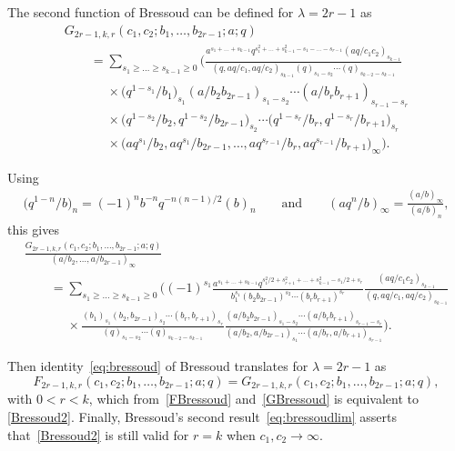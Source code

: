 \documentclass[pdftex]{sigma}
\numberwithin{equation}{section}
\begin{document}
The second function of Bressoud can be defined for $\lambda=2r-1$ as
\begin{gather*}
G_{2r-1,k,r}(c_1,c_2;b_1,\dots,b_{2r-1};a;q)\\
\qquad=\sum_{s_1\geq\dots\geq s_{k-1}\geq0}\bigg(\frac{a^{s_1+\dots+s_{k-1}}q^{s_1^2+\dots+s_{k-1}^2-s_{1}-\dots-s_{r-1}}(aq/c_1c_2)_{s_{k-1}}}{(q,aq/c_1,aq/c_2)_{s_{k-1}}(q)_{s_1-s_2} \cdots(q)_{s_{k-2}-s_{k-1}}}\\
\phantom{\qquad=}{}\times\bigl(q^{1-s_1}/b_1\bigr)_{s_1}(a/b_2b_{2r-1})_{s_1-s_2}\cdots(a/b_rb_{r+1})_{s_{r-1}-s_r}\\
\phantom{\qquad=}{}\times\bigl(q^{1-s_2}/b_2,q^{1-s_2}/b_{2r-1}\bigr)_{s_2}\cdots\bigl(q^{1-s_r}/b_r,q^{1-s_r}/b_{r+1}\bigr)_{s_r}\\
\phantom{\qquad=}{}\times\bigl(aq^{s_1}/b_2,aq^{s_1}/b_{2r-1},\dots,aq^{s_{r-1}}/b_{r},aq^{s_{r-1}}/b_{r+1}\bigr)_\infty\bigg).
\end{gather*}

Using
\begin{gather*}
\bigl(q^{1-n}/b\bigr)_n=(-1)^nb^{-n}q^{-n(n-1)/2}(b)_n\qquad\mbox{and}\qquad(aq^n/b)_\infty=\frac{(a/b)_\infty}{(a/b)_n},
\end{gather*}
this gives
\begin{gather}
\frac{G_{2r-1,k,r}(c_1,c_2;b_1,\dots,b_{2r-1};a;q)}{(a/b_2,\dots,a/b_{2r-1})_\infty}\nonumber\\
\qquad=\sum_{s_1\geq\dots\geq s_{k-1}\geq0}\bigg((-1)^{s_1}\frac{a^{s_1+\dots+s_{k-1}}q^{s_1^2/2+s_{r+1}^2+\dots+s_{k-1}^2-s_{1}/2+s_{r}}}{b_1^{s_1}(b_2b_{2r-1})^{s_2}
\cdots(b_rb_{r+1})^{s_r}}\frac{(aq/c_1c_2)_{s_{k-1}}}{(q,aq/c_1,aq/c_2)_{s_{k-1}}}\nonumber\\
\phantom{\qquad=}{}\times \frac{(b_1)_{s_1}(b_2,b_{2r-1})_{s_2}\cdots(b_r,b_{r+1})_{s_r}}{(q)_{s_1-s_2}\cdots(q)_{s_{k-2}-s_{k-1}}}
\frac{(a/b_2b_{2r-1})_{s_1-s_2}\cdots(a/b_rb_{r+1})_{s_{r-1}-s_r}}{(a/b_2,a/b_{2r-1})_{s_1}\cdots(a/b_{r},a/b_{r+1})_{s_{r-1}}}\bigg).\label{GBressoud}
\end{gather}

Then identity~\eqref{eq:bressoud} of Bressoud translates for $\lambda=2r-1$ as
\begin{equation*}
F_{2r-1,k,r}(c_1,c_2;b_1,\dots,b_{2r-1};a;q)=G_{2r-1,k,r}(c_1,c_2;b_1,\dots,b_{2r-1};a;q),
\end{equation*}
with $0<r<k$, which from~\eqref{FBressoud} and~\eqref{GBressoud} is equivalent to \eqref{Bressoud2}.
Finally, Bressoud's second result~\eqref{eq:bressoudlim}
 asserts that~\eqref{Bressoud2} is still valid for $r=k$ when $c_1,c_2\to\infty$.
\end{document}
